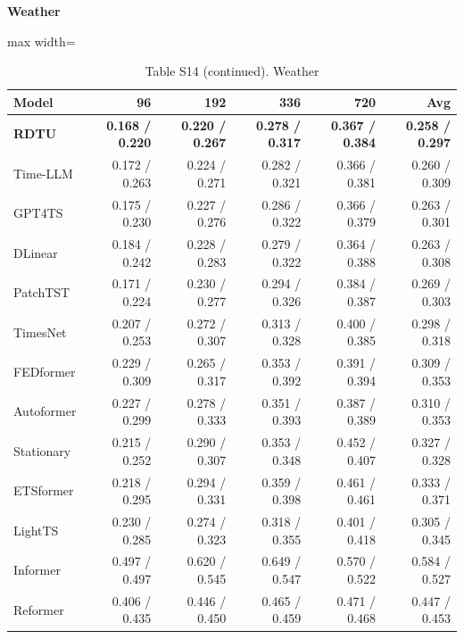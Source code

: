 \begin{table}[H]\centering\small
\caption*{Table S14 (continued). Weather}
\textbf{Weather}\par\smallskip
\begin{adjustbox}{max width=\linewidth}\begin{tabular}{lrrrrr}\toprule
\textbf{Model} & \textbf{96} & \textbf{192} & \textbf{336} & \textbf{720} & \textbf{Avg}\\\midrule
\rowcolor{blue!5}
\textbf{RDTU} & \textbf{0.168 / 0.220} & \textbf{0.220 / 0.267} & \textbf{0.278 / 0.317} & \textbf{0.367 / 0.384} & \textbf{0.258 / 0.297}\\
Time-LLM & 0.172 / 0.263 & 0.224 / 0.271 & 0.282 / 0.321 & 0.366 / 0.381 & 0.260 / 0.309\\
GPT4TS & 0.175 / 0.230 & 0.227 / 0.276 & 0.286 / 0.322 & 0.366 / 0.379 & 0.263 / 0.301\\
DLinear & 0.184 / 0.242 & 0.228 / 0.283 & 0.279 / 0.322 & 0.364 / 0.388 & 0.263 / 0.308\\
PatchTST & 0.171 / 0.224 & 0.230 / 0.277 & 0.294 / 0.326 & 0.384 / 0.387 & 0.269 / 0.303\\
TimesNet & 0.207 / 0.253 & 0.272 / 0.307 & 0.313 / 0.328 & 0.400 / 0.385 & 0.298 / 0.318\\
FEDformer & 0.229 / 0.309 & 0.265 / 0.317 & 0.353 / 0.392 & 0.391 / 0.394 & 0.309 / 0.353\\
Autoformer & 0.227 / 0.299 & 0.278 / 0.333 & 0.351 / 0.393 & 0.387 / 0.389 & 0.310 / 0.353\\
Stationary & 0.215 / 0.252 & 0.290 / 0.307 & 0.353 / 0.348 & 0.452 / 0.407 & 0.327 / 0.328\\
ETSformer & 0.218 / 0.295 & 0.294 / 0.331 & 0.359 / 0.398 & 0.461 / 0.461 & 0.333 / 0.371\\
LightTS & 0.230 / 0.285 & 0.274 / 0.323 & 0.318 / 0.355 & 0.401 / 0.418 & 0.305 / 0.345\\
Informer & 0.497 / 0.497 & 0.620 / 0.545 & 0.649 / 0.547 & 0.570 / 0.522 & 0.584 / 0.527\\
Reformer & 0.406 / 0.435 & 0.446 / 0.450 & 0.465 / 0.459 & 0.471 / 0.468 & 0.447 / 0.453\\
\bottomrule\end{tabular}\end{adjustbox}\end{table}
